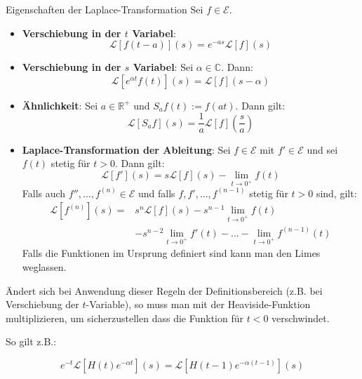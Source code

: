 \documentclass[a4paper,10pt]{article}
\begin{document}
\begin{mainbox}{Eigenschaften der Laplace-Transformation}
  Sei \(f\in\mathcal{E}\).
  \begin{itemize}
    \item{
      \textbf{Verschiebung in der \(t\) Variabel}:
      \begin{equation*} \mathcal{L}[f(t-a)](s)=e^{-as}\mathcal{L}[f](s) \end{equation*}
    }
    \item{
      \textbf{Verschiebung in der \(s\) Variabel}: Sei \(\alpha\in\mathbb{C}\). Dann: \begin{equation*} \mathcal{L}[e^{\alpha t}f(t)](s)=\mathcal{L}[f](s-\alpha) \end{equation*}
    }
    \item{
      \textbf{Ähnlichkeit}: Sei \(a\in\mathbb{R}^+\) und \(S_af(t):=f(at)\). Dann gilt: \begin{equation*} \mathcal{L}[S_af](s)=\frac{1}{a}\mathcal{L}[f]\left(\frac{s}{a}\right) \end{equation*}
    }
    \item{
      \textbf{Laplace-Transformation der Ableitung}: Sei \(f\in\mathcal{E}\) mit \(f'\in\mathcal{E}\) und sei \(f(t)\) stetig für \(t>0\). Dann gilt:
       \begin{equation*} \mathcal{L}[f'](s)=s\mathcal{L}[f](s)-\lim_{t\to0^+}f(t) \end{equation*} Falls auch \(f'',\dots,f^{( n )}\in\mathcal{E}\) und falls \(f,f',\dots,f^{(n-1)}\) stetig für \(t>0\) sind, gilt:
        \begin{align*} 
          \mathcal{L}[f^{( n )}](s) = & s^n\mathcal{L}[f](s) - s^{n-1}\lim_{t\to0^+}f(t) \\
          & - s^{n-2}\lim_{t\to0^+}f'(t) -\dots -\lim_{t\to0^+}f^{(n-1)}(t) 
        \end{align*}
        Falls die Funktionen im Ursprung definiert sind kann man den Limes weglassen.
    }
  \end{itemize}
\end{mainbox}

Ändert sich bei Anwendung dieser Regeln der Definitionsbereich (z.B. bei Verschiebung der $t$-Variable), so muss man mit der Heaviside-Funktion multiplizieren, um sicherzustellen dass die Funktion für $t < 0$ verschwindet.

So gilt z.B.:

$$
e^{-t} \mathcal{L}[H(t) e^{-\alpha t}](s) = \mathcal{L}[H(t - 1) e^{-\alpha(t-1)}](s)
$$
\end{document}
